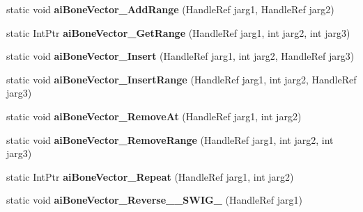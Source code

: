 \begin{DoxyCompactItemize}
\item 
\hypertarget{class_assimp_p_i_n_v_o_k_e_aaad20c7ff2cc2f2a090dd45f40fdcf4a}{static void {\bfseries ai\+Bone\+Vector\+\_\+\+Add\+Range} (Handle\+Ref jarg1, Handle\+Ref jarg2)}\label{class_assimp_p_i_n_v_o_k_e_aaad20c7ff2cc2f2a090dd45f40fdcf4a}

\item 
\hypertarget{class_assimp_p_i_n_v_o_k_e_aa2e20efd8263dd400a7b93438310ff5d}{static Int\+Ptr {\bfseries ai\+Bone\+Vector\+\_\+\+Get\+Range} (Handle\+Ref jarg1, int jarg2, int jarg3)}\label{class_assimp_p_i_n_v_o_k_e_aa2e20efd8263dd400a7b93438310ff5d}

\item 
\hypertarget{class_assimp_p_i_n_v_o_k_e_a0da33d59c2f645f07a962984438a84cf}{static void {\bfseries ai\+Bone\+Vector\+\_\+\+Insert} (Handle\+Ref jarg1, int jarg2, Handle\+Ref jarg3)}\label{class_assimp_p_i_n_v_o_k_e_a0da33d59c2f645f07a962984438a84cf}

\item 
\hypertarget{class_assimp_p_i_n_v_o_k_e_a0393712f3137aa0621b822b8ea081127}{static void {\bfseries ai\+Bone\+Vector\+\_\+\+Insert\+Range} (Handle\+Ref jarg1, int jarg2, Handle\+Ref jarg3)}\label{class_assimp_p_i_n_v_o_k_e_a0393712f3137aa0621b822b8ea081127}

\item 
\hypertarget{class_assimp_p_i_n_v_o_k_e_a276da7e6943edca0f6d66f647b20571a}{static void {\bfseries ai\+Bone\+Vector\+\_\+\+Remove\+At} (Handle\+Ref jarg1, int jarg2)}\label{class_assimp_p_i_n_v_o_k_e_a276da7e6943edca0f6d66f647b20571a}

\item 
\hypertarget{class_assimp_p_i_n_v_o_k_e_a5d7a4044129f8fa989a052d2387d4d8c}{static void {\bfseries ai\+Bone\+Vector\+\_\+\+Remove\+Range} (Handle\+Ref jarg1, int jarg2, int jarg3)}\label{class_assimp_p_i_n_v_o_k_e_a5d7a4044129f8fa989a052d2387d4d8c}

\item 
\hypertarget{class_assimp_p_i_n_v_o_k_e_ab26b645942ee67f1832c10bd83ec2148}{static Int\+Ptr {\bfseries ai\+Bone\+Vector\+\_\+\+Repeat} (Handle\+Ref jarg1, int jarg2)}\label{class_assimp_p_i_n_v_o_k_e_ab26b645942ee67f1832c10bd83ec2148}

\item 
\hypertarget{class_assimp_p_i_n_v_o_k_e_ab73cc344dcdfc1011b77eda4c139486d}{static void {\bfseries ai\+Bone\+Vector\+\_\+\+Reverse\+\_\+\+\_\+\+S\+W\+I\+G\+\_} (Handle\+Ref jarg1)}\label{class_assimp_p_i_n_v_o_k_e_ab73cc344dcdfc1011b77eda4c139486d}


\end{DoxyCompactItemize}

